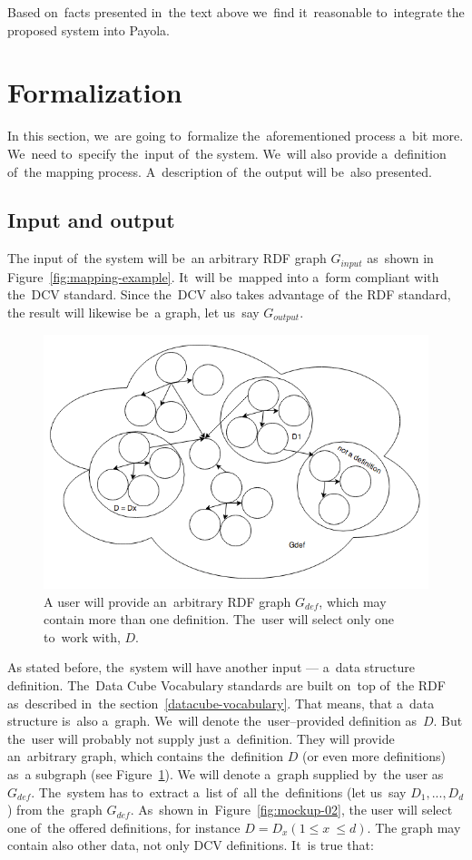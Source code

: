 Based on~facts presented in~the text above we~find it~reasonable to~integrate 
the proposed system into Payola.

\section{Formalization}

In this section, we~are going to~formalize the~aforementioned process a~bit 
more. We~need to~specify the~input of~the system. We~will also 
provide a~definition of~the mapping process. A~description of~the output will be~also presented.

\subsection{Input and output}

The input of~the system will be~an arbitrary RDF graph $G_{input}$ as~shown
in Figure~\ref{fig:mapping-example}. It~will be~mapped into a~form compliant
with the~DCV standard. Since the~DCV also takes advantage of~the RDF standard,
the result will likewise be~a graph, let us~say $G_{output}$.

\begin{figure}
	\centering
	\includegraphics[width=120mm]{img/definition-in-graph.png}
	\caption{A user will provide an~arbitrary RDF graph $G_{def}$, which may contain more than one definition. The~user will select only one to~work with, $D$.}
	\label{fig:definition-in-graph}
\end{figure}

As stated before, the~system will have another input --- a~data structure 
definition. The~Data Cube Vocabulary standards are built on~top of~the RDF as~described in~the 
section~\ref{datacube-vocabulary}. That means, that a~data structure is~also a~graph. We~will denote the~user--provided definition as~$D$. But the~user will probably not 
supply just a~definition. They will provide an~arbitrary graph, which contains the~definition $D$ 
(or even more definitions) as~a subgraph (see Figure~\ref{fig:definition-in-graph}).
We will denote a~graph
supplied by~the user as~$G_{def}$. The~system has to~extract a~list of~all the~definitions
(let us~say $D_1, ..., D_d$) from the~graph $G_{def}$. As~shown in~Figure~\ref{fig:mockup-02},
the user will select one of~the offered definitions, for instance $D = D_x (1 \leq x~\leq d)$.
The graph may contain also other data, not only DCV definitions. It~is true 
that:\\

